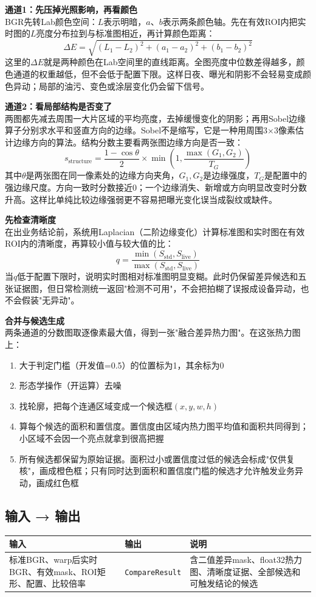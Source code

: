 \documentclass[12pt,a4paper]{ctexart}
\begin{document}
\textbf{通道1：先压掉光照影响，再看颜色}\\[2pt]
BGR先转Lab颜色空间：$L$表示明暗，$a$、$b$表示两条颜色轴。先在有效ROI内把实时图的$L$亮度分布拉到与标准图相近，再计算颜色距离：\[ \Delta E = \sqrt{(L_1-L_2)^2 + (a_1-a_2)^2 + (b_1-b_2)^2} \]
这里的$\Delta E$就是两种颜色在Lab空间里的直线距离。全图亮度中位数差得越多，颜色通道的权重越低，但不会低于配置下限。这样日夜、曝光和阴影不会轻易变成颜色异动；局部的油污、变色或涂层变化仍会留下信号。

\textbf{通道2：看局部结构是否变了}\\[2pt]
两图都先减去周围一大片区域的平均亮度，去掉缓慢变化的阴影；再用Sobel边缘算子分别求水平和竖直方向的边缘。Sobel不是缩写，它是一种用周围3×3像素估计边缘方向的算法。结构分数主要看两张图边缘方向是否一致：\[ s_{\text{structure}}=\frac{1-\cos\theta}{2}\times \min\left(1,\frac{\max(G_1,G_2)}{T_G}\right) \]
其中$\theta$是两张图在同一像素处的边缘方向夹角，$G_1,G_2$是边缘强度，$T_G$是配置中的强边缘尺度。方向一致时分数接近0；一个边缘消失、新增或方向明显改变时分数升高。这样比单纯比较边缘强弱更不容易把曝光变化误当成裂纹或缺件。

\textbf{先检查清晰度}\\[2pt]
在出业务结论前，系统用Laplacian（二阶边缘变化）计算标准图和实时图在有效ROI内的清晰度，再算较小值与较大值的比：\[ q=\frac{\min(S_{\text{std}},S_{\text{live}})}{\max(S_{\text{std}},S_{\text{live}})} \]
当$q$低于配置下限时，说明实时图相对标准图明显变糊。此时仍保留差异候选和五张证据图，但日常检测统一返回"检测不可用"，不会把拍糊了误报成设备异动，也不会假装"无异动"。

\textbf{合并与候选生成}\\[2pt]
两条通道的分数图取逐像素最大值，得到一张"融合差异热力图"。在这张热力图上：
\begin{enumerate}
\item 大于判定门槛（开发值=0.5）的位置标为1，其余标为0
\item 形态学操作（开运算）去噪
\item 找轮廓，把每个连通区域变成一个候选框$(x, y, w, h)$
\item 算每个候选的面积和置信度。置信度由区域内热力图平均值和面积共同得到；小区域不会因一个亮点就拿到很高把握
\item 所有候选都保留为原始证据。面积过小或置信度过低的候选会标成"仅供复核"，画成橙色框；只有同时达到面积和置信度门槛的候选才允许触发业务异动，画成红色框
\end{enumerate}

\subsection*{输入 → 输出}
\noindent\begin{tabular}{|p{4cm}|p{4cm}|p{5cm}|}
\hline
\textbf{输入} & \textbf{输出} & \textbf{说明} \\
\hline
标准BGR、warp后实时BGR、有效mask、ROI矩形、配置、比较倍率 & \texttt{CompareResult} & 含二值差异mask、float32热力图、清晰度证据、全部候选和可触发结论的候选 \\
\hline
\end{tabular}
\end{document}
